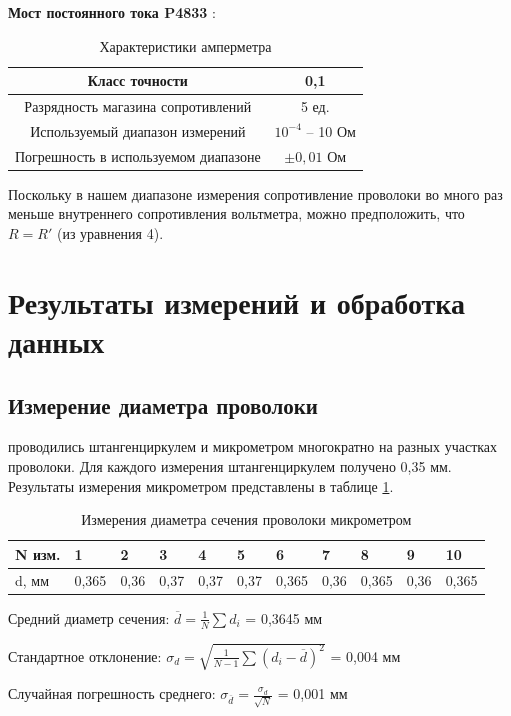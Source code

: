 \documentclass[a4paper,12pt]{article} %
\begin{document}
\textbf{Мост постоянного тока P4833} :
\begin{table}[h]
\centering
\caption{Характеристики амперметра}
\begin{tabular}{|c|c|}
\hline 
Класс точности & 0,1 \\  
\hline 
Разрядность магазина сопротивлений & 5 ед. \\ 
\hline 
Используемый диапазон измерений & $10^{-4}$ -- 10 Ом \\ 
\hline 
Погрешность в используемом диапазоне & $\pm 0,01$ Ом \\ 
\hline 
\end{tabular} 
\end{table}

Поскольку в нашем диапазоне измерения сопротивление проволоки во много раз меньше внутреннего сопротивления вольтметра, можно предположить, что $R=R'$ (из уравнения 4).

\section{Результаты измерений и обработка данных}
\subsection{Измерение диаметра проволоки}
 проводились штангенциркулем и микрометром многократно на разных участках проволоки. Для каждого измерения штангенциркулем получено 0,35 мм. Результаты измерения микрометром представлены в таблице \ref{d_ism}.

\begin{table}[!ht]
    \caption{Измерения диаметра сечения проволоки микрометром}
    \label{d_ism}
    \centering
    \begin{tabular}{|l|l|l|l|l|l|l|l|l|l|l|}
    \hline
        N изм. & 1 & 2 & 3 & 4 & 5 & 6 & 7 & 8 & 9 & 10 \\ \hline
        d, мм & 0,365 & 0,36 & 0,37 & 0,37 & 0,37 & 0,365 & 0,36 & 0,365 & 0,36 & 0,365 \\ \hline
    \end{tabular}
\end{table}

Средний диаметр сечения: $\overline{d} = \frac{1}{N}\sum d_i$ = 0,3645 мм

Стандартное отклонение: $\sigma_d = \sqrt{\frac{1}{N-1}\sum(d_i-\overline{d})^2}$ = 0,004 мм

Случайная погрешность среднего: $\sigma_{\overline{d}} = \frac{\sigma_d}{\sqrt{N}}$ = 0,001 мм
\end{document}
